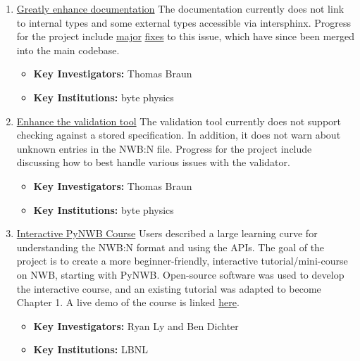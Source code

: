 \documentclass{article}
\begin{document}
\begin{enumerate}
    \item \href{https://neurodatawithoutborders.github.io/nwb_hackathons/HCK06_2019_Janelia/projects/greatly-enhance-documentation/}{Greatly enhance documentation}  The documentation currently does not link to internal types and some external types accessible via intersphinx. Progress for the project include \href{https://github.com/NeurodataWithoutBorders/pynwb/pull/938}{major} \href{https://github.com/hdmf-dev/hdmf/pull/61}{fixes} to this issue, which have since been merged into the main codebase.
        \vspace{-0.2cm}
        \begin{itemize}[noitemsep]
            \item \textbf{Key Investigators:} Thomas Braun
            \item \textbf{Key Institutions:} byte physics
        \end{itemize}
    
    \item \href{https://neurodatawithoutborders.github.io/nwb_hackathons/HCK06_2019_Janelia/projects/validation-enhancements/}{Enhance the validation tool}  The validation tool currently does not support checking against a stored specification. In addition, it does not warn about unknown entries in the NWB:N file. Progress for the project include discussing how to best handle various issues with the validator.
        \vspace{-0.2cm}
        \begin{itemize}[noitemsep]
            \item \textbf{Key Investigators:} Thomas Braun
            \item \textbf{Key Institutions:} byte physics
        \end{itemize}
           
    \item \href{https://neurodatawithoutborders.github.io/nwb_hackathons/HCK06_2019_Janelia/projects/Interactive_PyNWB_Course/}{Interactive PyNWB Course} Users described a large learning curve for understanding the NWB:N format and using the APIs. The goal of the project is to create a more beginner-friendly, interactive tutorial/mini-course on NWB, starting with PyNWB. Open-source software was used to develop the interactive course, and an existing tutorial was adapted to become Chapter 1. A live demo of the course is linked \href{https://pynwb-course.netlify.com/}{here}.
        \vspace{-0.2cm}
        \begin{itemize}[noitemsep]
            \item \textbf{Key Investigators:} Ryan Ly and Ben Dichter
            \item \textbf{Key Institutions:} LBNL
        \end{itemize}
        

\end{enumerate}
\end{document}
